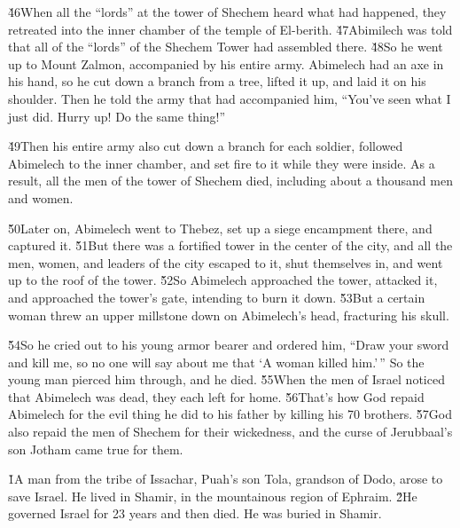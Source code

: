 \v{46}When all the ``lords'' at the tower of Shechem heard what had happened, they retreated into the inner chamber of the temple of El-berith. \v{47}Abimilech was told that all of the ``lords'' of the Shechem Tower had assembled there. \v{48}So he went up to Mount Zalmon, accompanied by his entire army. Abimelech had an axe in his hand, so he cut down a branch from a tree, lifted it up, and laid it on his shoulder. Then he told the army that had accompanied him, ``You've seen what I just did. Hurry up! Do the same thing!''

\v{49}Then his entire army also cut down a branch for each soldier, followed Abimelech to the inner chamber, and set fire to it while they were inside. As a result, all the men of the tower of Shechem died, including about a thousand men and women.

\v{50}Later on, Abimelech went to Thebez, set up a siege encampment there, and captured it. \v{51}But there was a fortified tower in the center of the city, and all the men, women, and leaders of the city escaped to it, shut themselves in, and went up to the roof of the tower. \v{52}So Abimelech approached the tower, attacked it, and approached the tower's gate, intending to burn it down. \v{53}But a certain woman threw an upper millstone down on Abimelech's head, fracturing his skull.

\v{54}So he cried out to his young armor bearer and ordered him, ``Draw your sword and kill me, so no one will say about me that `A woman killed him.'\,'' So the young man pierced him through, and he died. \v{55}When the men of Israel noticed that Abimelech was dead, they each left for home. \v{56}That's how God repaid Abimelech for the evil thing he did to his father by killing his 70 brothers. \v{57}God also repaid the men of Shechem for their wickedness, and the curse of Jerubbaal's son Jotham came true for them.

\v{1}A man from the tribe of Issachar, Puah's son Tola, grandson of Dodo, arose to save Israel. He lived in Shamir, in the mountainous region of Ephraim. \v{2}He governed Israel for 23 years and then died. He was buried in Shamir.

